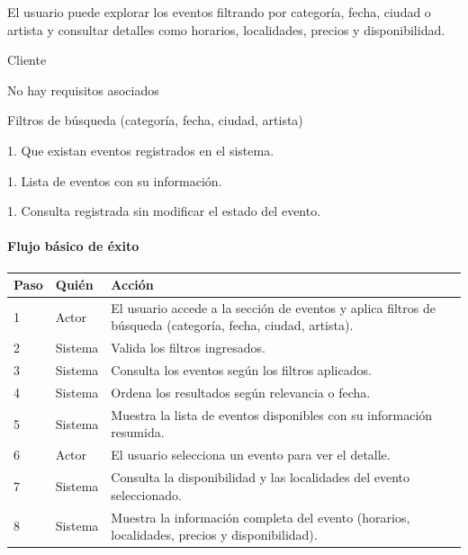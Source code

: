 \begin{description}[leftmargin=!, labelwidth=3.4cm, style=nextline, topsep=3pt]
\item[Objetivo] El usuario puede explorar los eventos filtrando por categoría, fecha, ciudad o artista y consultar detalles como horarios, localidades, precios y disponibilidad.

\item[Actores] Cliente

\item[CU relacionados] No hay requisitos asociados

\item[Entradas] Filtros de búsqueda (categoría, fecha, ciudad, artista)

\item[Pre-condiciones] 1. Que existan eventos registrados en el sistema.

\item[Salidas] 1. Lista de eventos con su información.

\item[Post-condiciones] 1. Consulta registrada sin modificar el estado del evento.

\end{description}

\paragraph{Flujo básico de éxito}
\begin{longtable}{P{1.1cm}P{1.8cm}P{10.5cm}}
\toprule
\textbf{Paso} & \textbf{Quién} & \textbf{Acción}\\
\midrule
{} & Actor & El usuario accede a la sección de eventos y aplica filtros de búsqueda (categoría, fecha, ciudad, artista).\\
2 & Sistema & Valida los filtros ingresados.\\
3 & Sistema & Consulta los eventos según los filtros aplicados.\\
4 & Sistema & Ordena los resultados según relevancia o fecha.\\
5 & Sistema & Muestra la lista de eventos disponibles con su información resumida.\\
6 & Actor & El usuario selecciona un evento para ver el detalle.\\
7 & Sistema & Consulta la disponibilidad y las localidades del evento seleccionado.\\
8 & Sistema & Muestra la información completa del evento (horarios, localidades, precios y disponibilidad).\\
\bottomrule
\end{longtable}

